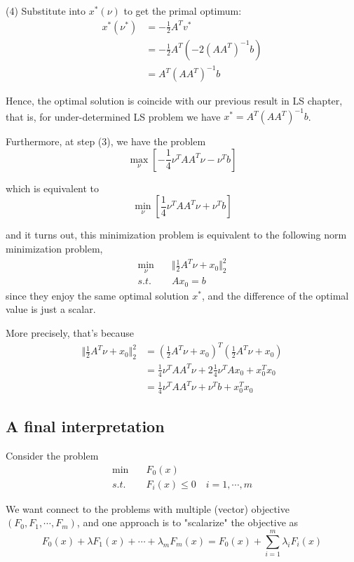 \begin{example}
	(4) Substitute into $x^*(\nu)$ to get the primal optimum:
	\begin{align*}
	x^*(\nu^*) 
	&=-\frac{1}{2} A^T v^* \\
	&= -\frac{1}{2}A^T(-2(AA^T)^{-1}b)\\
	&= A^T(AA^T)^{-1}b
	\end{align*}

Hence, the optimal solution is coincide with our previous result in LS chapter, that is, for under-determined LS problem we have $x^* = A^T(AA^T)^{-1}b$.

Furthermore, at step (3), we have the problem
$$\max_{\nu} [- \frac{1}{4}\nu^TAA^T\nu - \nu^Tb ]$$

which is equivalent to 
$$\min_{\nu} [\frac{1}{4}\nu^TAA^T\nu + \nu^Tb ]$$

and it turns out, this minimization problem is equivalent to the following norm minimization problem,
\begin{align*}
\min_\nu\quad & \Vert\frac{1}{2}A^T\nu + x_0\Vert^2_2\\
s.t.\quad & Ax_0 = b 
\end{align*}
since they enjoy the same optimal solution $x^*$, and the difference of the optimal value is just a scalar.

More precisely, that's because
\begin{align*}
	\Vert \frac{1}{2}A^T\nu + x_0\Vert_2^2 
	&= (\frac{1}{2}A^T\nu+x_0)^T(\frac{1}{2}A^T\nu+x_0)\\
	&= \frac{1}{4}\nu^TAA^T\nu + 2\frac{1}{4}\nu^TAx_0 + x_0^Tx_0\\
	&= \frac{1}{4}\nu^TAA^T\nu + \nu^Tb+x_0^Tx_0
\end{align*}

\end{example}


\subsection{A final interpretation}
Consider the problem
\begin{align*}
	\min \quad & F_0(x)\\
	s.t. \quad & F_i(x)\leq 0\quad i = 1,\cdots,m
\end{align*}

We want connect to the problems with multiple (vector) objective $(F_0,F_1,\cdots,F_m)$, and one approach is to "scalarize" the objective as 
\begin{equation*}
	F_0(x) + \lambda F_1(x) + \cdots + \lambda_mF_m(x) = F_0(x) + \sum^m_{i=1}\lambda_iF_i(x)
\end{equation*}

